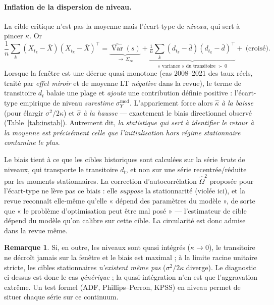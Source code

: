 \documentclass[11pt,a4paper]{article}
\theoremstyle{definition}
\newtheorem{remarque}{Remarque}
\DeclareMathOperator{\Var}{Var}
\newcommand{\transp}{^{\!\top}}
\begin{document}
\paragraph{Inflation de la dispersion de niveau.} La cible critique n'est pas la moyenne mais l'écart-type de \emph{niveau}, qui sert à pincer $\kappa$. Or
\[
\frac1n\sum_k (X_{t_k}-\bar X)(X_{t_k}-\bar X)\transp
=\underbrace{\widehat{\Var}(s)}_{\to\,\Sigma_\infty}
+\underbrace{\tfrac1n\sum_k (d_{t_k}-\bar d)(d_{t_k}-\bar d)\transp}_{\text{« variance » du transitoire }\succ\,0}+\ \text{(croisé)} .
\]
Lorsque la fenêtre est une décrue quasi monotone (cas 2008--2021 des taux réels, traité par \emph{effet miroir} et de moyenne LT \emph{négative} dans la revue), le terme de transitoire $d_t$ balaie une plage et \emph{ajoute} une contribution définie positive : l'écart-type empirique de niveau \emph{surestime} $\sigma^{\mathrm{mod}}_Y$. L'appariement force alors $\hat\kappa$ \emph{à la baisse} (pour élargir $\sigma^2/2\kappa$) et $\hat\sigma$ \emph{à la hausse} --- exactement le biais directionnel observé (Table~\ref{tab:instab}). Autrement dit, \emph{la statistique qui sert à identifier le retour à la moyenne est précisément celle que l'initialisation hors régime stationnaire contamine le plus}.

\begin{insightbox}
Le biais tient à ce que les cibles historiques sont calculées sur la série \emph{brute} de niveaux, qui transporte le transitoire $d_t$, et non sur une série recentrée/réduite par les moments stationnaires. La correction d'autocorrélation $\widehat\Omega^2$ proposée pour l'écart-type ne lève pas ce biais : elle \emph{suppose} la stationnarité (violée ici), et la revue reconnaît elle-même qu'elle « dépend des paramètres du modèle », de sorte que « le problème d'optimisation peut être mal posé » --- l'estimateur de cible dépend du modèle qu'on calibre sur cette cible. La circularité est donc admise dans la revue même.
\end{insightbox}

\begin{remarque}
Si, en outre, les niveaux sont quasi intégrés ($\kappa\to 0$), le transitoire ne décroît jamais sur la fenêtre et le biais est maximal ; à la limite racine unitaire stricte, les cibles stationnaires \emph{n'existent même pas} ($\sigma^2/2\kappa$ diverge). Le diagnostic ci-dessus est donc le cas \emph{générique} ; la quasi-intégration n'en est que l'aggravation extrême. Un test formel (ADF, Phillips--Perron, KPSS) en niveau permet de situer chaque série sur ce continuum.
\end{remarque}
\end{document}
